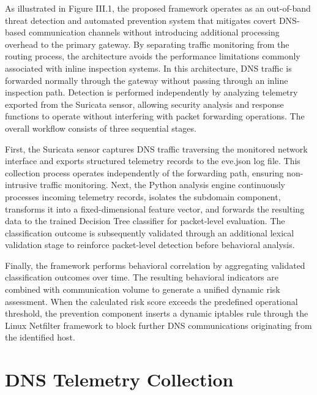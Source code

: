 \documentclass[14pt, a4paper, oneside]{report}
\begin{document}
As illustrated in Figure III.1, the proposed framework operates as an out-of-band threat detection and automated prevention system that mitigates covert DNS-based communication channels without introducing additional processing overhead to the primary gateway. By separating traffic monitoring from the routing process, the architecture avoids the performance limitations commonly associated with inline inspection systems. In this architecture, DNS traffic is forwarded normally through the gateway without passing through an inline inspection path. Detection is performed independently by analyzing telemetry exported from the Suricata sensor, allowing security analysis and response functions to operate without interfering with packet forwarding operations. The overall workflow consists of three sequential stages.

First, the Suricata sensor captures DNS traffic traversing the monitored network interface and exports structured telemetry records to the eve.json log file. This collection process operates independently of the forwarding path, ensuring non-intrusive traffic monitoring. Next, the Python analysis engine continuously processes incoming telemetry records, isolates the subdomain component, transforms it into a fixed-dimensional feature vector, and forwards the resulting data to the trained Decision Tree classifier for packet-level evaluation. The classification outcome is subsequently validated through an additional lexical validation stage to reinforce packet-level detection before behavioral analysis.

Finally, the framework performs behavioral correlation by aggregating validated classification outcomes over time. The resulting behavioral indicators are combined with communication volume  to generate a unified dynamic risk assessment. When the calculated risk score exceeds the predefined operational threshold, the prevention component inserts a dynamic iptables rule through the Linux Netfilter framework to block further DNS communications originating from the identified host.




\section{DNS Telemetry Collection}
\label{sec:traffic_collection}
\end{document}
